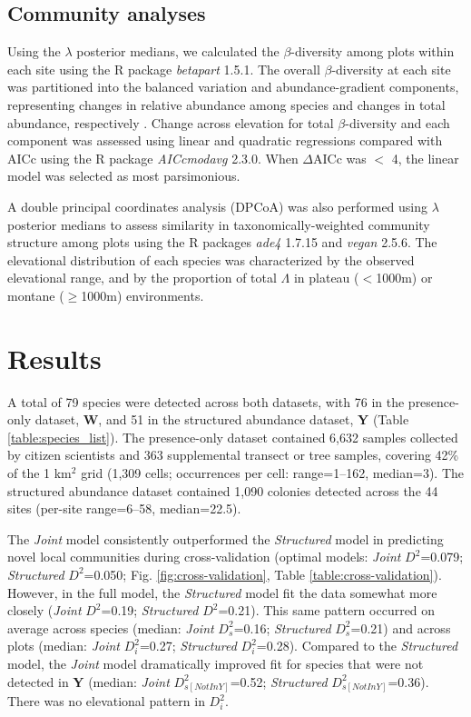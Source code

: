 \documentclass[preprint,final,times,12pt,3p]{elsarticle}
\begin{document}
\subsection{Community analyses}
Using the $\lambda$ posterior medians, we calculated the $\beta$-diversity among plots within each site using the R package \emph{betapart} 1.5.1. The overall $\beta$-diversity at each site was partitioned into the balanced variation and abundance-gradient components, representing changes in relative abundance among species and changes in total abundance, respectively \citep{Baselga2017}. Change across elevation for total $\beta$-diversity and each component was assessed using linear and quadratic regressions compared with AICc using the R package \emph{AICcmodavg} 2.3.0. When $\Delta$AICc was $<$ 4, the linear model was selected as most parsimonious. 

A double principal coordinates analysis (DPCoA) was also performed using $\lambda$ posterior medians to assess similarity in taxonomically-weighted community structure among plots \citep{Dray2015,Pavoine2019} using the R packages \emph{ade4} 1.7.15 and \emph{vegan} 2.5.6. The elevational distribution of each species was characterized by the observed elevational range, and by the proportion of total $\Lambda$ in plateau ($<$1000m) or montane ($\geq$1000m) environments.




\section{Results}
\label{S:3}
A total of 79 species were detected across both datasets, with 76 in the presence-only dataset, \textbf{W}, and 51 in the structured abundance dataset, \textbf{Y} (Table \ref{table:species_list}). The presence-only dataset contained 6,632 samples collected by citizen scientists and 363 supplemental transect or tree samples, covering 42\% of the 1 km$^2$ grid (1,309 cells; occurrences per cell: range=1–162, median=3). The structured abundance dataset contained 1,090 colonies detected across the 44 sites (per-site range=6–58, median=22.5). 

The \emph{Joint} model consistently outperformed the \emph{Structured} model in predicting novel local communities during cross-validation (optimal models: \emph{Joint} $D^2$=0.079; \emph{Structured} $D^2$=0.050; Fig. \ref{fig:cross-validation}, Table \ref{table:cross-validation}). However, in the full model, the \emph{Structured} model fit the data somewhat more closely (\emph{Joint} $D^2$=0.19; \emph{Structured} $D^2$=0.21). This same pattern occurred on average across species (median: \emph{Joint} $D^2_s$=0.16; \emph{Structured} $D^2_s$=0.21) and across plots (median: \emph{Joint} $D^2_i$=0.27; \emph{Structured} $D^2_i$=0.28). Compared to the \emph{Structured} model, the \emph{Joint} model dramatically improved fit for species that were not detected in \textbf{Y} (median: \emph{Joint} $D^2_{s[Not In Y]}$=0.52; \emph{Structured} $D^2_{s[Not In Y]}$=0.36). There was no elevational pattern in $D^2_i$.
\end{document}
